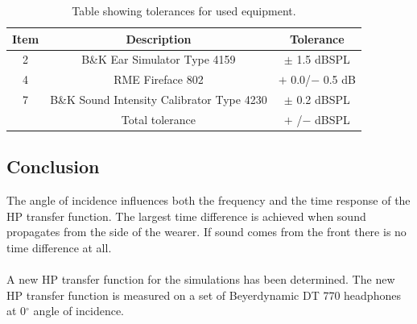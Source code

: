 \begin{table}[H]
	\centering
	\begin{tabular}{ c c c } \toprule
		{Item}	& 		{Description} 	& {Tolerance}	 \\ \bottomrule 
		2	&	B\&K Ear Simulator Type 4159				& $\pm$ 1.5 dBSPL \cite{BK4159Tol} 	\\
		4	& RME Fireface 802			& $+$ 0.0/$-$ 0.5 dB\cite{RME802} \\
		7	&	B\&K Sound Intensity Calibrator Type 4230	& $\pm$ 0.2 dBSPL\cite{BK4231Tol}	\\ \bottomrule
		&	Total tolerance								& $+$ /$-$ dBSPL	\\ \bottomrule	
	\end{tabular}
	\caption{Table showing tolerances for used equipment.}
	\label{AngIncTolerances}
\end{table}

\subsection{Conclusion}
The angle of incidence influences both the frequency and the time response of the HP transfer function.  The largest time difference is achieved when sound propagates from the side of the wearer. If sound comes from the front there is no time difference at all. 
\\\\
A new HP transfer function for the simulations has been determined. The new HP transfer function is measured on a set of Beyerdynamic DT 770 headphones at 0$^\circ$ angle of incidence.   